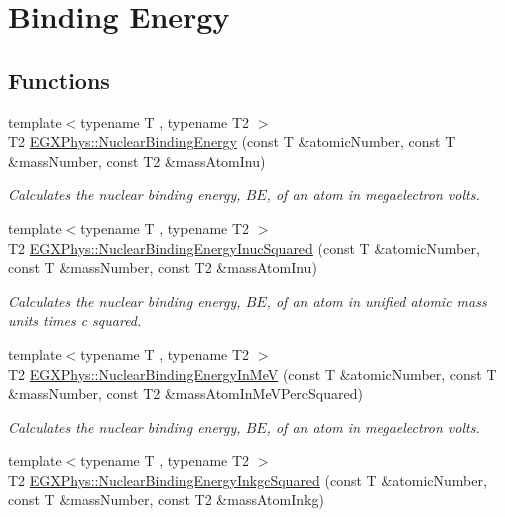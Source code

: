\hypertarget{group___e_g_x_phys-_nuclear_binding_energy}{}\section{Binding Energy}
\label{group___e_g_x_phys-_nuclear_binding_energy}
\subsection*{Functions}
\begin{DoxyCompactItemize}
\item 
{\footnotesize template$<$typename T , typename T2 $>$ }\\T2 \mbox{\hyperlink{group___e_g_x_phys-_nuclear_binding_energy_gab6832bf15ead7b4e867e759e0a2a078e}{E\+G\+X\+Phys\+::\+Nuclear\+Binding\+Energy}} (const T \&atomic\+Number, const T \&mass\+Number, const T2 \&mass\+Atom\+Inu)
\begin{DoxyCompactList}\small\item\em Calculates the nuclear binding energy, $BE$, of an atom in megaelectron volts. \end{DoxyCompactList}\item 
{\footnotesize template$<$typename T , typename T2 $>$ }\\T2 \mbox{\hyperlink{group___e_g_x_phys-_nuclear_binding_energy_gafeed0fb7220e4900a8da011ed9fca44f}{E\+G\+X\+Phys\+::\+Nuclear\+Binding\+Energy\+Inuc\+Squared}} (const T \&atomic\+Number, const T \&mass\+Number, const T2 \&mass\+Atom\+Inu)
\begin{DoxyCompactList}\small\item\em Calculates the nuclear binding energy, $BE$, of an atom in unified atomic mass units times c squared. \end{DoxyCompactList}\item 
{\footnotesize template$<$typename T , typename T2 $>$ }\\T2 \mbox{\hyperlink{group___e_g_x_phys-_nuclear_binding_energy_ga25f5d2d32fad7e28e278cf8b5ea8ffa8}{E\+G\+X\+Phys\+::\+Nuclear\+Binding\+Energy\+In\+MeV}} (const T \&atomic\+Number, const T \&mass\+Number, const T2 \&mass\+Atom\+In\+Me\+V\+Perc\+Squared)
\begin{DoxyCompactList}\small\item\em Calculates the nuclear binding energy, $BE$, of an atom in megaelectron volts. \end{DoxyCompactList}\item 
{\footnotesize template$<$typename T , typename T2 $>$ }\\T2 \mbox{\hyperlink{group___e_g_x_phys-_nuclear_binding_energy_gaf229d8c0d2aa30ff95aa20e5213df3bd}{E\+G\+X\+Phys\+::\+Nuclear\+Binding\+Energy\+Inkgc\+Squared}} (const T \&atomic\+Number, const T \&mass\+Number, const T2 \&mass\+Atom\+Inkg)

\end{DoxyCompactItemize}
